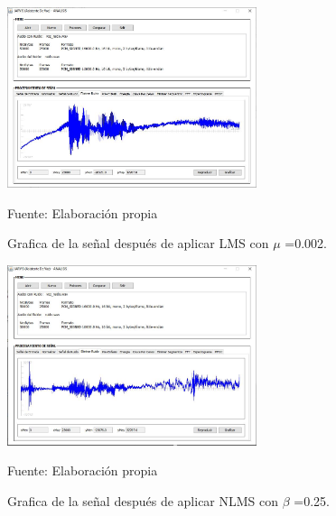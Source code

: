 \begin{figure}[H]
\begin{center}
\includegraphics[width=0.65\textwidth]{Imagenes/Cap3/image080}
\end{center}
\begin{center}
\vskip -0.5cm
\caption{\small{Grafica de la señal después de aplicar LMS con $\mu$ =0.002.}}
\label{fig:figura3.80}
{\small{Fuente: Elaboración propia}}
\end{center}
\end{figure}

\begin{figure}[H]
\begin{center}
\includegraphics[width=0.65\textwidth]{Imagenes/Cap3/image081}
\end{center}
\begin{center}
\vskip -0.5cm
\caption{\small{Grafica de la señal después de aplicar NLMS con $\beta$ =0.25.}}
\label{fig:figura3.81}
{\small{Fuente: Elaboración propia}}
\end{center}
\end{figure}

\vskip -1cm

